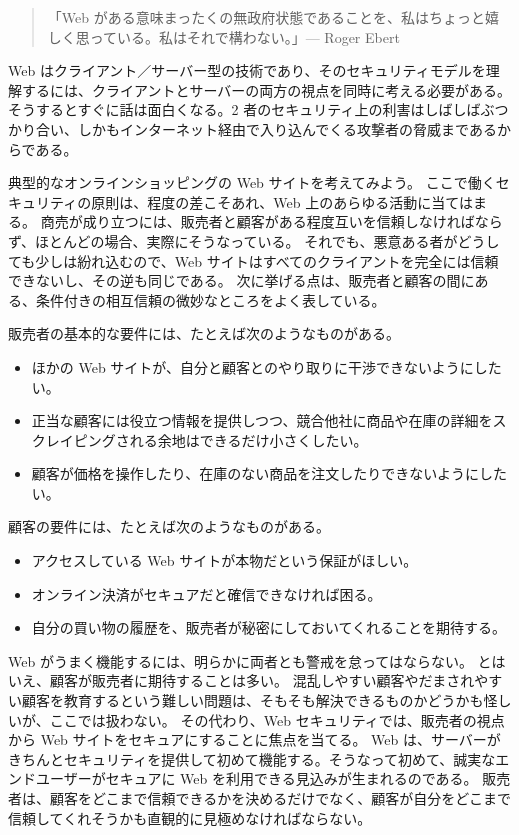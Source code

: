\documentclass[uplatex]{jsarticle}
\def\label#1{}%
\begin{document}
\begin{quote}
「Web がある意味まったくの無政府状態であることを、私はちょっと嬉しく思っている。私はそれで構わない。」\hfill --- Roger Ebert
\end{quote}

Web はクライアント／サーバー型の技術であり、そのセキュリティモデルを理解するには、クライアントとサーバーの両方の視点を同時に考える必要がある。
そうするとすぐに話は面白くなる。2 者のセキュリティ上の利害はしばしばぶつかり合い、しかもインターネット経由で入り込んでくる攻撃者の脅威まであるからである。

典型的なオンラインショッピングの Web サイトを考えてみよう。
ここで働くセキュリティの原則は、程度の差こそあれ、Web 上のあらゆる活動に当てはまる。
商売が成り立つには、販売者と顧客がある程度互いを信頼しなければならず、ほとんどの場合、実際にそうなっている。
それでも、悪意ある者がどうしても少しは紛れ込むので、Web サイトはすべてのクライアントを完全には信頼できないし、その逆も同じである。
次に挙げる点は、販売者と顧客の間にある、条件付きの相互信頼の微妙なところをよく表している。

\begin{exa}[販売者と顧客の要件]\label{exa:ch11-merchant-customer}
販売者の基本的な要件には、たとえば次のようなものがある。
\begin{itemize}
\item ほかの Web サイトが、自分と顧客とのやり取りに干渉できないようにしたい。
\item 正当な顧客には役立つ情報を提供しつつ、競合他社に商品や在庫の詳細をスクレイピングされる余地はできるだけ小さくしたい。
\item 顧客が価格を操作したり、在庫のない商品を注文したりできないようにしたい。
\end{itemize}
顧客の要件には、たとえば次のようなものがある。
\begin{itemize}
\item アクセスしている Web サイトが本物だという保証がほしい。
\item オンライン決済がセキュアだと確信できなければ困る。
\item 自分の買い物の履歴を、販売者が秘密にしておいてくれることを期待する。
\end{itemize}
\end{exa}

Web がうまく機能するには、明らかに両者とも警戒を怠ってはならない。
とはいえ、顧客が販売者に期待することは多い。
混乱しやすい顧客やだまされやすい顧客を教育するという難しい問題は、そもそも解決できるものかどうかも怪しいが、ここでは扱わない。
その代わり、Web セキュリティでは、販売者の視点から Web サイトをセキュアにすることに焦点を当てる。
Web は、サーバーがきちんとセキュリティを提供して初めて機能する。そうなって初めて、誠実なエンドユーザーがセキュアに Web を利用できる見込みが生まれるのである。
販売者は、顧客をどこまで信頼できるかを決めるだけでなく、顧客が自分をどこまで信頼してくれそうかも直観的に見極めなければならない。
\end{document}
